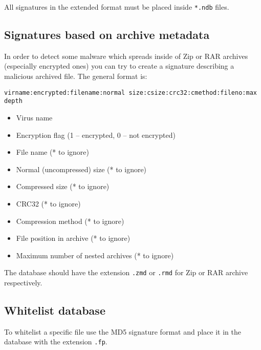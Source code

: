 \documentclass[a4paper,titlepage,12pt]{article}
\begin{document}
    All signatures in the extended format must be placed inside \verb+*.ndb+ files.

    \subsection{Signatures based on archive metadata}
    In order to detect some malware which spreads inside of Zip or RAR archives
    (especially encrypted ones) you can try to create a signature describing
    a malicious archived file. The general format is:
\begin{verbatim}
virname:encrypted:filename:normal size:csize:crc32:cmethod:fileno:max depth
\end{verbatim}
    \begin{itemize}
	\item Virus name
	\item Encryption flag (1 -- encrypted, 0 -- not encrypted)
	\item File name (* to ignore)
	\item Normal (uncompressed) size (* to ignore)
	\item Compressed size (* to ignore)
	\item CRC32 (* to ignore)
	\item Compression method (* to ignore)
	\item File position in archive (* to ignore)
	\item Maximum number of nested archives (* to ignore)
    \end{itemize}
    The database should have the extension \verb+.zmd+ or \verb+.rmd+ for
    Zip or RAR archive respectively.

    \subsection{Whitelist database}
    To whitelist a specific file use the MD5 signature format and place
    it in the database with the extension \verb+.fp+.
\end{document}
